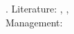 \documentclass{article}
\begin{document}
	.\newline
	Literature: \cite{Sally}, \cite{Joseph}, \cite{Salinger} \\
	Management: \cite{Chris}
	
	
\end{document}
